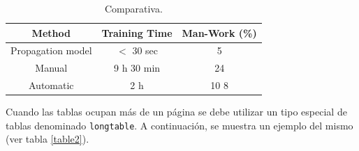 \documentclass[spanish,openright]{book}
\begin{document}
\begin{table}
\renewcommand{\arraystretch}{1.3}
  \caption{Comparativa.}
  \label{table1}
  \begin{center}
\begin{tabular}{|c|c|c|}
      \hline
      Method & Training Time & Man-Work (\%)\\
      \hline
      Propagation model & $<$ 30 sec & 5\\
      \hline
      Manual & 9 h 30 min & 24\\
      \hline
      Automatic & 2 h & 10 8\\
      \hline
    \end{tabular}
  \end{center}
\end{table}

Cuando las tablas ocupan más de un página se debe utilizar un tipo
especial de tablas denominado \texttt{longtable}. A continuación, se
muestra un ejemplo del mismo (ver tabla \ref{table2}).
\end{document}
